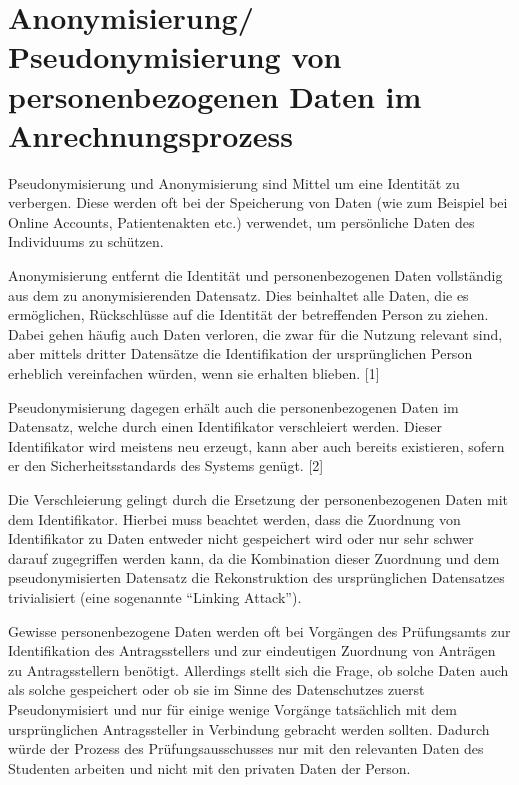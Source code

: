 \chapter{Anonymisierung/ Pseudonymisierung von personenbezogenen Daten im Anrechnungsprozess}

Pseudonymisierung und Anonymisierung sind Mittel um eine Identität zu verbergen. 
Diese werden oft bei der Speicherung von Daten (wie zum Beispiel bei Online Accounts, Patientenakten etc.) verwendet, um persönliche Daten des Individuums zu schützen. 

Anonymisierung entfernt die Identität und personenbezogenen Daten vollständig aus dem zu anonymisierenden Datensatz. Dies beinhaltet alle Daten, die es ermöglichen, Rückschlüsse auf die Identität der betreffenden Person zu ziehen. Dabei gehen häufig auch Daten verloren, die zwar für die Nutzung relevant sind, aber mittels dritter Datensätze die Identifikation der ursprünglichen Person erheblich vereinfachen würden, wenn sie erhalten blieben.  [1]

Pseudonymisierung dagegen erhält auch die personenbezogenen Daten im Datensatz, welche durch einen Identifikator verschleiert werden. Dieser Identifikator wird meistens neu erzeugt, kann aber auch bereits existieren, sofern er den Sicherheitsstandards des Systems genügt. [2]

Die Verschleierung gelingt durch die Ersetzung der personenbezogenen Daten mit dem Identifikator. Hierbei muss beachtet werden, dass die Zuordnung von Identifikator zu Daten entweder nicht gespeichert wird oder nur sehr schwer darauf zugegriffen werden kann, da die Kombination dieser Zuordnung und dem pseudonymisierten Datensatz die Rekonstruktion des ursprünglichen Datensatzes trivialisiert (eine sogenannte “Linking Attack”).

Gewisse personenbezogene Daten werden oft bei Vorgängen des Prüfungsamts zur Identifikation des Antragsstellers und zur eindeutigen Zuordnung von Anträgen zu Antragsstellern benötigt. Allerdings stellt sich die Frage, ob solche Daten auch als solche gespeichert oder ob sie im Sinne des Datenschutzes zuerst Pseudonymisiert und nur für einige wenige Vorgänge tatsächlich mit dem ursprünglichen Antragssteller in Verbindung gebracht werden sollten. Dadurch würde der Prozess des Prüfungsausschusses  nur mit den relevanten Daten des Studenten arbeiten und nicht mit den privaten Daten der Person. 

